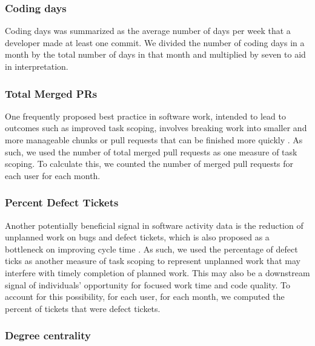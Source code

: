 \documentclass[manuscript,screen,review]{acmart}
\begin{document}
\subsubsection{Coding days}\label{coding-days}

Coding days was summarized as the average number of days per week that a
developer made at least one commit. We divided the number of coding days
in a month by the total number of days in that month and multiplied by
seven to aid in interpretation.

\subsubsection{Total Merged PRs}\label{total-merged-prs}

One frequently proposed best practice in software work, intended to lead
to outcomes such as improved task scoping, involves breaking work into
smaller and more manageable chunks or pull requests that can be finished
more quickly
\citep{kudrjavetsSmallCodeChanges2022, linesWhyEliteDev2023, riosaWrittenUnwrittenGuide2019, zhangPullRequestLatency2022}.
As such, we used the number of total merged pull requests as one measure
of task scoping. To calculate this, we counted the number of merged pull
requests for each user for each month.

\subsubsection{Percent Defect Tickets}\label{percent-defect-tickets}

Another potentially beneficial signal in software activity data is the
reduction of unplanned work on bugs and defect tickets, which is also
proposed as a bottleneck on improving cycle time
\citep{paudelMeasuringImpactTechnical2024, paudelMeasuringImpactTechnical2024, rosserSystemsPerspectiveTechnical2021, toxboeCycleTime2023}.
As such, we used the percentage of defect ticks as another measure of
task scoping to represent unplanned work that may interfere with timely
completion of planned work. This may also be a downstream signal of
individuals' opportunity for focused work time and code quality. To
account for this possibility, for each user, for each month, we computed
the percent of tickets that were defect tickets.

\subsubsection{Degree centrality}\label{degree-centrality}
\end{document}
